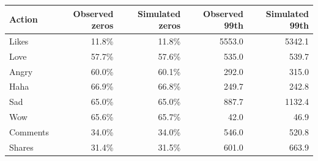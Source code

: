 \begin{tabular}{lrrrr}
\toprule
Action & Observed zeros & Simulated zeros & Observed 99th & Simulated 99th \\
\midrule
Likes & 11.8\% & 11.8\% & 5553.0 & 5342.1 \\
Love & 57.7\% & 57.6\% & 535.0 & 539.7 \\
Angry & 60.0\% & 60.1\% & 292.0 & 315.0 \\
Haha & 66.9\% & 66.8\% & 249.7 & 242.8 \\
Sad & 65.0\% & 65.0\% & 887.7 & 1132.4 \\
Wow & 65.6\% & 65.7\% & 42.0 & 46.9 \\
Comments & 34.0\% & 34.0\% & 546.0 & 520.8 \\
Shares & 31.4\% & 31.5\% & 601.0 & 663.9 \\
\bottomrule
\end{tabular}
